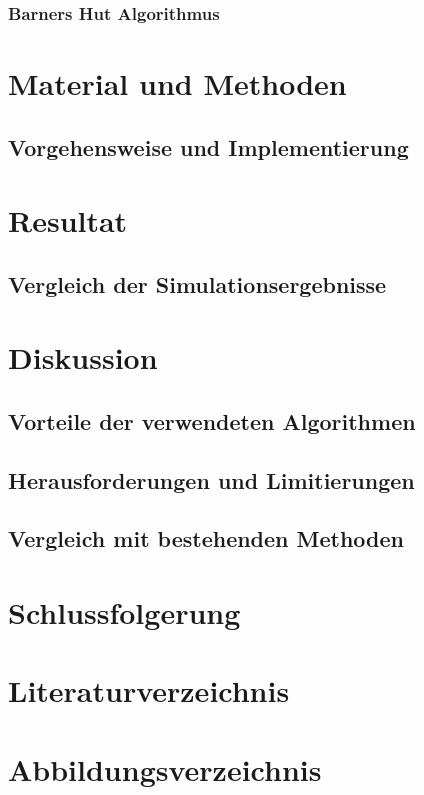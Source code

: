 \documentclass[a4paper,12pt,twoside]{article}
\begin{document}
\subsubsection{Barners Hut Algorithmus}


\section{Material und Methoden}
\subsection{Vorgehensweise und Implementierung}

\section{Resultat}
\subsection{Vergleich der Simulationsergebnisse}

\section{Diskussion}
\subsection{Vorteile der verwendeten Algorithmen}
\subsection{Herausforderungen und Limitierungen}
\subsection{Vergleich mit bestehenden Methoden}

\section{Schlussfolgerung}
\section{Literaturverzeichnis}
\section{Abbildungsverzeichnis}
\end{document}
